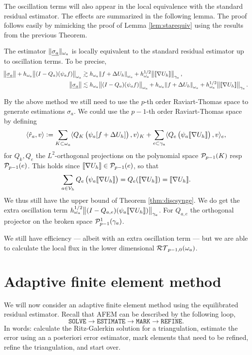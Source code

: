 \documentclass[thesis.tex]{subfiles}
\begin{document}
The oscillation terms will also appear in the local equivalence with the standard residual estimator. 
The effects are summarized in the following lemma. The proof follows easily by mimicking the proof of Lemma \ref{lem:starequiv}
using the results from the previous Theorem.
\begin{lem}
  \label{lem:locequivosc}
  The estimator $\uanorm{\v{\sigma_a}}_{\w_a}$ is locally equivalent to the standard residual estimator up to oscillation terms.
  To be precise, 
  \begin{align*}
    \norm{\v{\sigma_a}} + h_{\w_a}\norm{(I - Q_a)(\psi_a f)}_{\w_a} &\gtrsim h_{\w_a} \norm{f + \Delta U_h}_{\w_a} + h^{1/2}_{\w_a} \norm{\llbracket \nabla U_h \rrbracket}_{\gamma_a},\\
    \norm{\v{\sigma_a}} &\lesssim h_{\w_a}\norm{(I - Q_a)(\psi_a f)}_{\w_a} + h_{\w_a} \norm{f + \Delta U_h}_{\w_a} + h^{1/2}_{\w_a} \norm{\llbracket \nabla U_h \rrbracket}_{\gamma_a}.
  \end{align*}
\end{lem}
{\color{blue}
  By the above method we still need to use the $p$-th order Raviart-Thomas space to generate estimations $\sigma_a$.
  We could use the $p-1$-th order Raviart-Thomas space by defining
  \[
    \ip{\hat r_a,v} := \sum_{K \subset \w_a} \ip{Q_K \left(\psi_a[f + \Delta U_h]\right), v}_K +
    \sum_{e \subset \gamma_a} \ip{Q_e \left(\psi_a \llbracket \nabla U_h \rrbracket \right),v}_e,
  \]
  for $Q_k,Q_e$ the $L^2$-orthogonal projections on the polynomial space $\P_{p-1}(K)$ resp $\P_{p-1}(e)$.
  This holds since $\llbracket \nabla U_h \rrbracket \in \P_{p-1}(e)$, so that
  \[
    \sum_{a \in \V_h} Q_e \left(\psi_a \llbracket \nabla U_h \rrbracket\right) = Q_e (\llbracket \nabla U_h \rrbracket) = \llbracket \nabla U_h \rrbracket.
  \]
  We thus still have the upper bound of Theorem \ref{thm:discsynge}.
  We do get the extra oscillation term $h_{\w_a}^{1/2} \norm{(I- Q_{a,e})(\psi_a \llbracket \nabla U_h \rrbracket)}_{\gamma_a}$.
  For $Q_{a,e}$ the orthogonal projector on the broken space $\P_{p-1}^1(\gamma_a)$.

  We still have efficiency --- albeit with an extra oscillation term --- but we are able to calculate
  the local flux in the lower dimensional $\RT_{p-1, 0}(\w_a)$.
}

\section{Adaptive finite element method}
\label{sec:afemequil}
We will now consider an adaptive finite element method using the equilibrated residual estimator.
Recall that AFEM can be described by the following loop,
\[
  \texttt{SOLVE} \to \texttt{ESTIMATE} \to \texttt{MARK} \to \texttt{REFINE}.
\]
In words: calculate the Ritz-Galerkin solution for a triangulation, estimate
the error using an a posteriori error estimator, mark elements that need to be refined, refine
the triangulation, and start over. 
\end{document}
